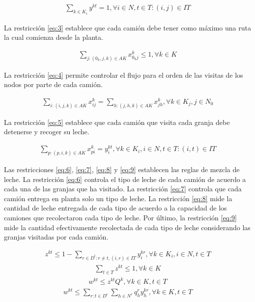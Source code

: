         \begin{align} \label{eq:2}
            \sum_{k\in K_i} y^{k t} = 1, \forall i \in N, t \in T : (i, j) \in IT
        \end{align}
        
     La restricción  \ref{eq:3} establece que cada camión debe tener como máximo una ruta la cual
comienza desde la planta.

        \begin{align} \label{eq:3}
            \sum_{j: (0_k, j, k) \in AK} x_{0_k j}^{k} \leq 1, \forall k \in K
        \end{align}
        
     La restricción \ref{eq:4} permite controlar el flujo para el orden de las visitas de los nodos
por parte de cada camión.

        \begin{align} \label{eq:4}
            \sum_{i: (i, j, k) \in AK} x_{i j}^{k} =  \sum_{h: (j, h, k) \in AK} x_{j h}^{k} , \forall k \in K_j, j \in N_0
        \end{align}

     La restricción \ref{eq:5} establece que cada camión que visita cada granja debe detenerse y
recoger su leche.

        \begin{align} \label{eq:5}
            \sum_{p: (p, i, k) \in AK} x_{p i}^{k} =  y_{i}^{k t} , \forall k \in K_i, i \in N, t \in T: (i, t) \in IT
        \end{align}

     Las restricciones \ref{eq:6}, \ref{eq:7}, \ref{eq:8} y \ref{eq:9} establecen las reglas de mezcla de leche. La restricción \ref{eq:6} controla el tipo de leche de cada camión de acuerdo a cada una de las granjas que ha visitado. La restricción \ref{eq:7} controla que cada camión entrega en planta solo un tipo de leche. La restricción \ref{eq:8} mide la cantidad de leche entregada de cada tipo de acuerdo a la capacidad de los camiones que recolectaron cada tipo de leche. Por último, la restricción \ref{eq:9} mide la cantidad efectivamente recolectada de cada tipo de leche considerando las granjas visitadas por cada camión.

        \begin{align} \label{eq:6}
            z^{k t} \leq 1 - \sum_{r \in D^t: r \neq t, (i, r) \in IT }  y_{i}^{k r} , \forall k \in K_i, i \in N, t \in T
        \end{align}
        \begin{align} \label{eq:7}
            \sum_{t\in T} z^{k t} \leq 1, \forall k \in K
        \end{align}
        \begin{align} \label{eq:8}
            w^{ k t } \leq z^{k t} Q^k, \forall k \in K, t \in T
        \end{align}
        \begin{align} \label{eq:9}
            w^{k t} \leq \sum_{r: t\in D^r} \sum_{h\in N^r} q_{h}^{r} y_{h}^{k r}  , \forall k \in K, t \in T
        \end{align}

